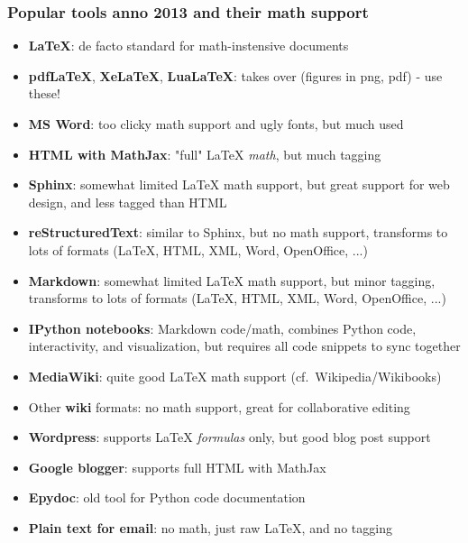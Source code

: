 \documentclass{beamer}
\begin{document}
\begin{frame}
\frametitle{Popular tools anno 2013 and their math support}

\begin{itemize}
 \item<2-> \textbf{LaTeX}: de facto standard for math-instensive documents

 \item<3-> \textbf{pdfLaTeX}, \textbf{XeLaTeX}, \textbf{LuaLaTeX}: takes over (figures in png, pdf) - use these!

 \item<4-> \textbf{MS Word}: too clicky math support and ugly fonts, but much used

 \item<5-> \textbf{HTML with MathJax}: "full" {\LaTeX} \emph{math}, but much tagging

 \item<6-> \textbf{Sphinx}:
   somewhat limited {\LaTeX} math support, but great support for web design,
   and less tagged than HTML

 \item<7-> \textbf{reStructuredText}: similar to Sphinx, but no math support, transforms to
   lots of formats ({\LaTeX}, HTML, XML, Word, OpenOffice, ...)

 \item<8-> \textbf{Markdown}: somewhat limited {\LaTeX} math support, but minor tagging,
   transforms to lots of formats ({\LaTeX}, HTML, XML, Word, OpenOffice, ...)

 \item<9-> \textbf{IPython notebooks}: Markdown code/math,
   combines Python code, interactivity, and
   visualization, but requires all code snippets to sync together

 \item<10-> \textbf{MediaWiki}: quite good {\LaTeX} math support (cf.~Wikipedia/Wikibooks)

 \item<11-> Other \textbf{wiki} formats: no math support, great for collaborative editing

 \item<12-> \textbf{Wordpress}: supports {\LaTeX} \emph{formulas} only, but good blog post support

 \item<13-> \textbf{Google blogger}: supports full HTML with MathJax

 \item<14-> \textbf{Epydoc}: old tool for Python code documentation

 \item<15-> \textbf{Plain text for email}: no math, just raw {\LaTeX}, and no tagging
\end{itemize}

\noindent
\end{frame}
\end{document}
